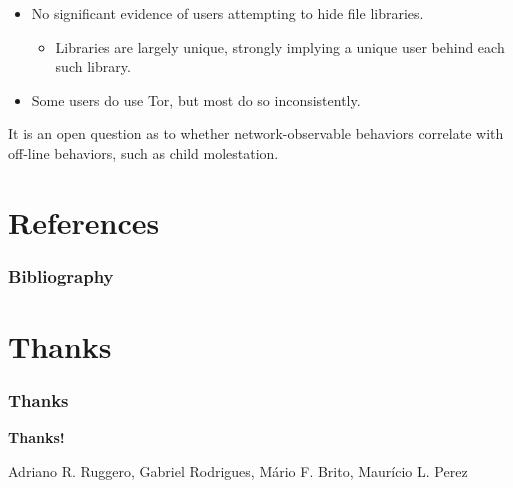 \documentclass[notes]{beamer}
\begin{document}
\begin{frame}

\begin{itemize}

\item[\checkmark]No significant evidence of users attempting to hide file libraries.

	\begin{itemize}

	\item Libraries are largely unique, strongly implying a unique user behind each such library.
	
	\end{itemize}

\item[\checkmark]Some users do use Tor, but most do so inconsistently.

\end{itemize}

\end{frame}

\begin{frame}

\begin{block}

It is an open question as to whether network-observable
behaviors correlate with off-line behaviors, such as
child molestation.

\end{block}

\end{frame}

\section{References}
\begin{frame} %

\frametitle{Bibliography}




\end{frame}

\section{Thanks}
\begin{frame}
\frametitle{Thanks}
\vskip30pt

\begin{center}
{\bf \color{alert} Thanks!}
\end{center}

\vskip30pt

\begin{center}

\vskip12pt

Adriano R. Ruggero, Gabriel Rodrigues, Mário F. Brito, Maurício L. Perez

\end{center}

\end{frame}
\end{document}
